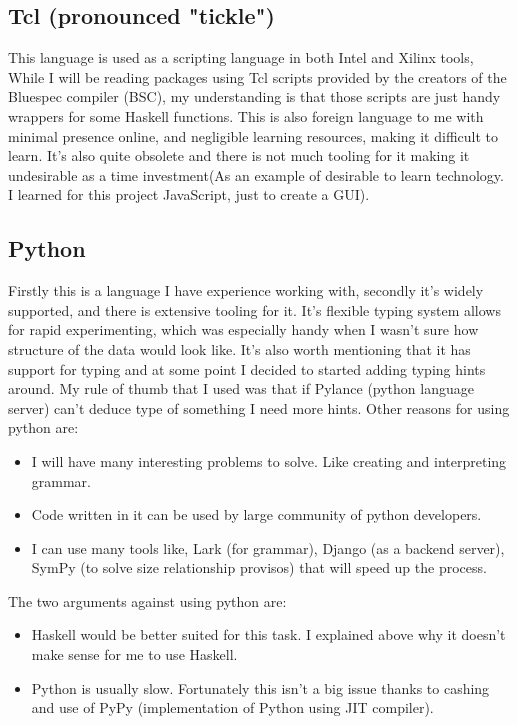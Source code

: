 \documentclass[14pt]{report}
\begin{document}
\subsection{Tcl (pronounced "tickle")}
This language is used as a scripting language in both Intel and Xilinx tools, While I will be reading packages using Tcl scripts provided by the creators of the Bluespec compiler (BSC), my understanding is that those scripts are just handy wrappers for some Haskell functions. This is also foreign language to me with minimal presence online, and negligible learning resources, making it difficult to learn. It's also quite obsolete and there is not much tooling for it making it undesirable as a time investment(As an example of desirable to learn technology. I learned for this project JavaScript, just to create a GUI).
\subsection{Python}
Firstly this is a language I have experience working with, secondly it's widely supported, and there is extensive tooling for it. It's flexible typing system allows for rapid experimenting, which was especially handy when I wasn't sure how structure of the data would look like. It's also worth mentioning that it has support for typing and at some point I decided to started adding typing hints around. My rule of thumb that I used was that if Pylance (python language server) can't deduce type of something I need more hints.
Other reasons for using python are:
\begin{itemize}
    \item I will have many interesting problems to solve. Like creating and interpreting grammar.
    \item Code written in it can be used by large community of python developers.
    \item I can use many tools like, Lark (for grammar), Django (as a backend server), SymPy (to solve size relationship provisos) that will speed up the process.
\end{itemize}
The two arguments against using python are:
\begin{itemize}
    \item Haskell would be better suited for this task. I explained above why it doesn't make sense for me to use Haskell. 
    \item Python is usually slow. Fortunately this isn't a big issue thanks to cashing and use of PyPy (implementation of Python using JIT compiler).
\end{itemize}
\end{document}
